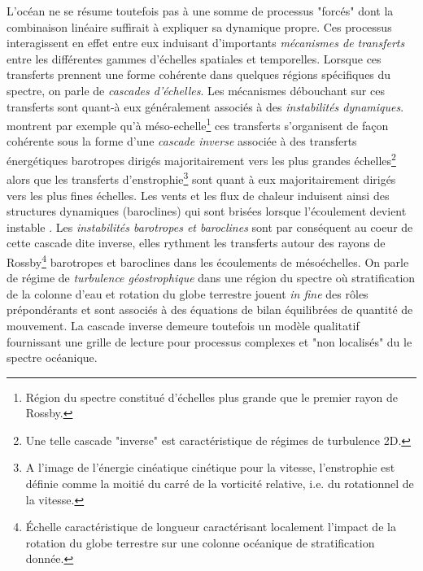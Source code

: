 
L'océan ne se résume toutefois pas à une somme de processus "forcés" dont la combinaison linéaire suffirait à expliquer sa dynamique propre. Ces processus interagissent en effet entre eux induisant d'importants \textit {mécanismes de transferts} entre les différentes gammes d'échelles spatiales et temporelles. Lorsque ces transferts prennent une forme cohérente dans quelques régions spécifiques du spectre, on parle de \textit{cascades d'échelles}. Les mécanismes débouchant sur ces transferts sont quant-à eux généralement associés à des \textit{instabilités dynamiques}.\\
\cite{salmon_baroclinic_1980} montrent par exemple qu'à méso-echelle\footnote{Région du spectre constitué d'échelles plus grande que le premier rayon de Rossby.} ces transferts s'organisent de façon cohérente sous la forme d'une \textit{cascade inverse} associée à des transferts énergétiques barotropes dirigés majoritairement vers les plus grandes échelles\footnote{Une telle cascade "inverse" est caractéristique de régimes de turbulence 2D.} alors que les transferts d'enstrophie\footnote{A l'image de l'énergie cinéatique cinétique pour la vitesse, l'enstrophie est définie comme la moitié du carré de la vorticité relative, i.e. du rotationnel de la vitesse.} sont quant à eux majoritairement dirigés vers les plus fines échelles. 
Les vents et les flux de chaleur induisent ainsi des structures dynamiques (baroclines) qui sont brisées lorsque l'écoulement devient instable \citep{vallis_atmospheric_2006}.
Les \textit{instabilités barotropes et baroclines} sont par conséquent au coeur de cette cascade dite inverse, elles rythment les transferts autour des rayons de Rossby\footnote{Échelle caractéristique de longueur caractérisant localement l'impact de la rotation du globe terrestre sur une colonne océanique de stratification donnée.} barotropes et baroclines dans les écoulements de mésoéchelles. On parle de régime de \textit{turbulence géostrophique} \citep{charney_geostrophic_1971} dans une région du spectre où stratification de la colonne d'eau et rotation du globe terrestre jouent \textit{in fine} des rôles prépondérants et sont associés à des équations de bilan équilibrées de quantité de mouvement. La cascade inverse demeure toutefois un modèle qualitatif fournissant une grille de lecture pour processus complexes et "non localisés" du le spectre océanique.\\
